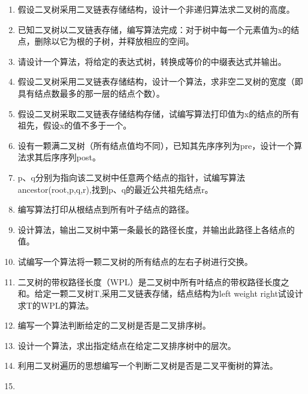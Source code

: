 \documentclass[lang=cn,newtx,10pt,scheme=chinese]{../../elegantbook}
\begin{document}
\begin{enumerate}
\vspace{5cm}
\item
  假设二叉树采用二叉链表存储结构，设计一个非递归算法求二叉树的高度。
\vspace{5cm}
\item
  已知二叉树以二叉链表存储，编写算法完成：对于树中每一个元素值为x的结点，删除以它为根的子树，并释放相应的空间。
\vspace{5cm}
\item
  请设计一个算法，将给定的表达式树，转换成等价的中缀表达式并输出。
\vspace{5cm}
\item
  假设二叉树采用二叉链表存储结构，设计一个算法，求非空二叉树的宽度（即具有结点数最多的那一层的结点个数）。
\vspace{5cm}
\item
  假设二叉树采取二叉链表存储结构存储，试编写算法打印值为x的结点的所有祖先，假设x的值不多于一个。
\vspace{5cm}
\item
  设有一颗满二叉树（所有结点值均不同），已知其先序序列为pre，设计一个算法求其后序序列post。
\vspace{5cm}
\item
  p、q分别为指向该二叉树中任意两个结点的指针，试编写算法ancestor(root,p,q,r),找到p、q的最近公共祖先结点r。
\vspace{5cm}
\item
  编写算法打印从根结点到所有叶子结点的路径。
\vspace{5cm}
\item
  设计算法，输出二叉树中第一条最长的路径长度，并输出此路径上各结点的值。
\vspace{5cm}
\item
  试编写一个算法将一颗二叉树的所有结点的左右子树进行交换。
\vspace{5cm}
\item
  二叉树的带权路径长度（WPL）是二叉树中所有叶结点的带权路径长度之和。给定一颗二叉树T,采用二叉链表存储，结点结构为left
  weight right试设计求T的WPL的算法。
\vspace{5cm}
\item
  编写一个算法判断给定的二叉树是否是二叉排序树。
\vspace{5cm}
\item
  设计一个算法，求出指定结点在给定二叉排序树中的层次。
\vspace{5cm}
\item
  利用二叉树遍历的思想编写一个判断二叉树是否是二叉平衡树的算法。
\vspace{5cm}
\item

\end{enumerate}
\end{document}
